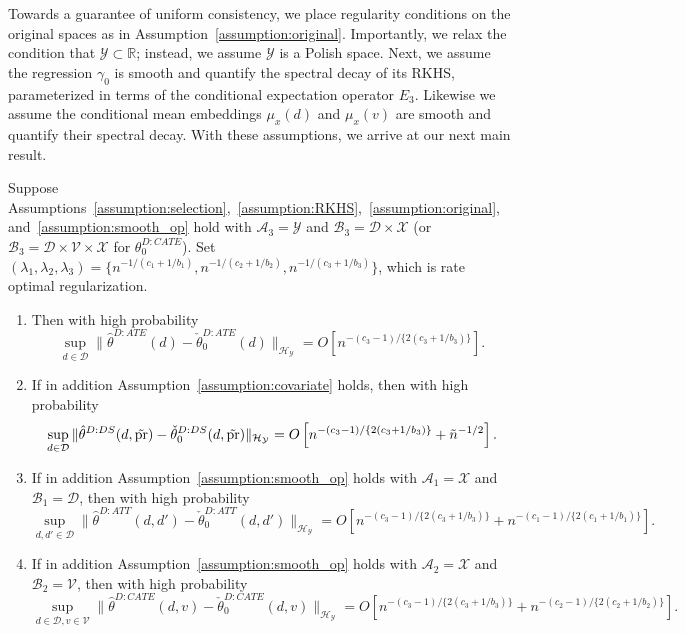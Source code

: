 Towards a guarantee of uniform consistency, we place regularity conditions on the original spaces as in Assumption~\ref{assumption:original}. Importantly, we relax the condition that $\mathcal{Y}\subset \mathbb{R}$; instead, we assume $\mathcal{Y}$ is a Polish space. Next, we assume the regression $\gamma_0$ is smooth and quantify the spectral decay of its RKHS, parameterized in terms of the conditional expectation operator $E_3$. Likewise we assume the conditional mean embeddings $\mu_x(d)$ and $\mu_x(v)$ are smooth and quantify their spectral decay. With these assumptions, we arrive at our next main result.
\begin{theorem}\label{theorem:consistency_dist}
Suppose Assumptions~\ref{assumption:selection},~\ref{assumption:RKHS},~\ref{assumption:original}, and~\ref{assumption:smooth_op} hold with $\mathcal{A}_3=\mathcal{Y}$ and $\mathcal{B}_3=\mathcal{D}\times \mathcal{X}$ (or $\mathcal{B}_3=\mathcal{D}\times \mathcal{V}\times \mathcal{X}$ for $\theta_0^{D:CATE}$). Set $(\lambda_1,\lambda_2,\lambda_3)=\{n^{-1/(c_1+1/b_1)},n^{-1/(c_2+1/b_2)},n^{-1/(c_3+1/b_3)}\}$, which is rate optimal regularization.
\begin{enumerate}
    \item Then with high probability
    $$
    \sup_{d\in\mathcal{D}}\|\hat{\theta}^{D:ATE}(d)-\check{\theta}_0^{D:ATE}(d)\|_{\mathcal{H}_{\mathcal{Y}}}=O\left[n^{-(c_3-1)/\{2(c_3+1/b_3)\}}\right].
$$
 \item If in addition Assumption~\ref{assumption:covariate} holds, then with high probability
      $$
     \sup_{d\in\mathcal{D}}\|\hat{\theta}^{D:DS}(d,\tilde{\text{\normalfont pr}})-\check{\theta}_0^{D:DS}(d,\tilde{\text{\normalfont pr}})\|_{\mathcal{H}_{\mathcal{Y}}}=O\left[ n^{-(c_3-1)/\{2(c_3+1/b_3)\}}+\tilde{n}^{-1/2}\right].
    $$
    \item If in addition Assumption~\ref{assumption:smooth_op} holds with $\mathcal{A}_1=\mathcal{X}$ and $\mathcal{B}_1=\mathcal{D}$, then with high probability
        $$
    \sup_{d,d'\in\mathcal{D}}\|\hat{\theta}^{D:ATT}(d,d')-\check{\theta}_0^{D:ATT}(d,d')\|_{\mathcal{H}_{\mathcal{Y}}}=O\left[n^{-(c_3-1)/\{2(c_3+1/b_3)\}}+n^{-(c_1-1)/\{2(c_1+1/b_1)\}}\right].
$$
 \item If in addition Assumption~\ref{assumption:smooth_op} holds with $\mathcal{A}_2=\mathcal{X}$ and $\mathcal{B}_2=\mathcal{V}$, then with high probability
      $$
     \sup_{d\in\mathcal{D},v\in\mathcal{V}}\|\hat{\theta}^{D:CATE}(d,v)-\check{\theta}_0^{D:CATE}(d,v)\|_{\mathcal{H}_{\mathcal{Y}}}=O\left[n^{-(c_3-1)/\{2(c_3+1/b_3)\}}+n^{-(c_2-1)/\{2(c_2+1/b_2)\}}\right].
    $$
\end{enumerate}
\end{theorem}
